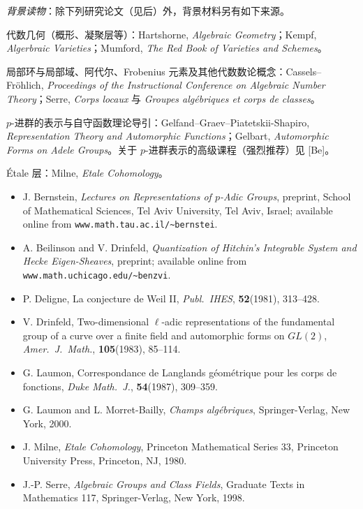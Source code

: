 {\small
\noindent\textit{背景读物}：除下列研究论文（见后）外，背景材料另有如下来源。\par
\smallskip
\noindent 代数几何（概形、凝聚层等）：Hartshorne, \emph{Algebraic Geometry}；Kempf, \emph{Algerbraic Varieties}；Mumford, \emph{The Red Book of Varieties and Schemes}。\par
\smallskip
\noindent 局部环与局部域、阿代尔、Frobenius 元素及其他代数数论概念：Cassels--Fr\"ohlich, \emph{Proceedings of the Instructional Conference on Algebraic Number Theory}；Serre, \emph{Corps locaux} 与 \emph{Groupes alg\'ebriques et corps de classes}。\par
\smallskip
\noindent $p$-进群的表示与自守函数理论导引：Gelfand--Graev--Piatetskii-Shapiro, \emph{Representation Theory and Automorphic Functions}；Gelbart, \emph{Automorphic Forms on Adele Groups}。关于 $p$-进群表示的高级课程（强烈推荐）见 [Be]。\par
\smallskip
\noindent \'Etale 层：Milne, \emph{Etale Cohomology}。\par
\smallskip
}

\begin{itemize}[leftmargin=4.6em,itemsep=0.22em,topsep=0.3em,label={}]
\item[{[Be]}] J. Bernstein, \emph{Lectures on Representations of $p$-Adic Groups}, preprint, School of Mathematical Sciences, Tel Aviv University, Tel Aviv, Israel; available online from \texttt{www.math.tau.ac.il/\~{}bernstei}.
\item[{[BD]}] A. Beilinson and V. Drinfeld, \emph{Quantization of Hitchin's Integrable System and Hecke Eigen-Sheaves}, preprint; available online from \texttt{www.math.uchicago.edu/\~{}benzvi}.
\item[{[De]}] P. Deligne, La conjecture de Weil II, \emph{Publ.\ IHES}, \textbf{52}(1981), 313--428.
\item[{[Dr]}] V. Drinfeld, Two-dimensional $\ell$-adic representations of the fundamental group of a curve over a finite field and automorphic forms on $GL(2)$, \emph{Amer.\ J.\ Math.}, \textbf{105}(1983), 85--114.
\item[{[L]}] G. Laumon, Correspondance de Langlands g\'eom\'etrique pour les corps de fonctions, \emph{Duke Math.\ J.}, \textbf{54}(1987), 309--359.
\item[{[L-MB]}] G. Laumon and L. Morret-Bailly, \emph{Champs alg\'ebriques}, Springer-Verlag, New York, 2000.
\item[{[Mi]}] J. Milne, \emph{Etale Cohomology}, Princeton Mathematical Series 33, Princeton University Press, Princeton, NJ, 1980.
\item[{[Se]}] J.-P. Serre, \emph{Algebraic Groups and Class Fields}, Graduate Texts in Mathematics 117, Springer-Verlag, New York, 1998.
\end{itemize}

